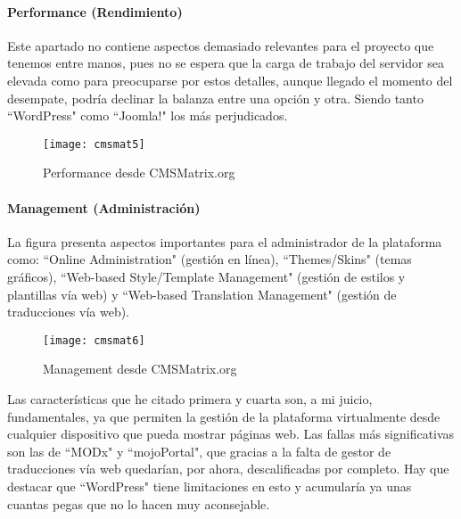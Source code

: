 \paragraph{Performance (Rendimiento)}

\par Este apartado no contiene aspectos demasiado relevantes para el proyecto que tenemos entre manos, pues no se espera que la carga de trabajo del servidor sea elevada como para preocuparse por estos detalles, aunque llegado el momento del desempate, podría declinar la balanza entre una opción y otra. Siendo tanto ``WordPress" como ``Joomla!" los más perjudicados.

\begin{figure}
\begin{narrow}{-0.15\linewidth}{-0.15\linewidth}
\centering
\texttt{[image: cmsmat5]}
\caption{Performance desde CMSMatrix.org}
\end{narrow}
\label{fig:cmsmat5}
\end{figure}


\paragraph{Management (Administración)}

\par La figura presenta aspectos importantes para el administrador de la plataforma como: ``Online Administration" (gestión en línea), ``Themes/Skins" (temas gráficos), ``Web-based Style/Template Management" (gestión de estilos y plantillas vía web) y ``Web-based Translation Management" (gestión de traducciones vía web).

\begin{figure}
\begin{narrow}{-0.15\linewidth}{-0.15\linewidth}
\centering
\texttt{[image: cmsmat6]}
\caption{Management desde CMSMatrix.org}
\end{narrow}
\label{fig:cmsmat6}
\end{figure}

\par Las características que he citado primera y cuarta son, a mi juicio, fundamentales, ya que permiten la gestión de la plataforma virtualmente desde cualquier dispositivo que pueda mostrar páginas web. Las fallas más significativas son las de ``MODx" y ``mojoPortal", que gracias a la falta de gestor de traducciones vía web quedarían, por ahora, descalificadas por completo. Hay que destacar que ``WordPress" tiene limitaciones en esto y acumularía ya unas cuantas pegas que no lo hacen muy aconsejable.


